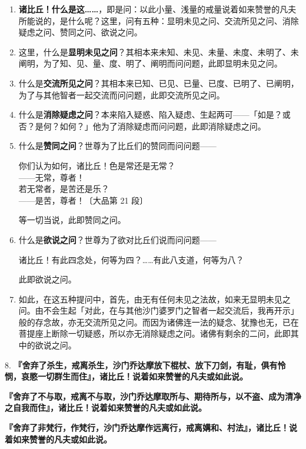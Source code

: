 \begin{enumerate}
\item \textbf{诸比丘！什么是这……}，即是问：以此小量、浅量的戒量说着如来赞誉的凡夫所能说的，是什么呢？这里，问有五种：显明未见之问、交流所见之问、消除疑虑之问、赞同之问、欲说之问。
\item 这里，什么是\textbf{显明未见之问}？其相本来未知、未见、未量、未度、未明了、未阐明，为了知、见、量、度、明了、阐明而问问题，此即显明未见之问。
\item 什么是\textbf{交流所见之问}？其相本来已知、已见、已量、已度、已明了、已阐明，为了与其他智者一起交流而问问题，此即交流所见之问。
\item 什么是\textbf{消除疑虑之问}？本来陷入疑惑、陷入疑虑、生起两可——「如是？或否？是何？如何？」他为了消除疑虑而问问题，此即消除疑虑之问。
\item 什么是\textbf{赞同之问}？世尊为了比丘们的赞同而问问题——\begin{quoting}你们认为如何，诸比丘！色是常还是无常？\\——无常，尊者！\\若无常者，是苦还是乐？\\——是苦，尊者！{\bluefootnotesize 〔大品第 21 段〕}\end{quoting}等一切当说，此即赞同之问。
\item 什么是\textbf{欲说之问}？世尊为了欲对比丘们说而问问题——\begin{quoting}诸比丘！有此四念处，何等为四？……有此八支道，何等为八？\end{quoting}此即欲说之问。
\item 如此，在这五种提问中，首先，由无有任何未见之法故，如来无显明未见之问。由不会生起「对此，在与其他沙门婆罗门之智者一起交流后，我再开示」般的存念故，亦无交流所见之问。而因为诸佛连一法的疑念、犹豫也无，已在菩提座上断除一切疑惑，所以亦无消除疑虑之问。诸佛有剩余的二问，此即其中的欲说之问。\end{enumerate}

{\Large 8.} \textbf{『舍弃了杀生，戒离杀生，沙门乔达摩放下棍杖、放下刀剑，有耻，俱有怜悯，哀愍一切群生而住』，诸比丘！说着如来赞誉的凡夫或如此说。}

\textbf{『舍弃了不与取，戒离不与取，沙门乔达摩取所与、期待所与，以不盗、成为清净之自我而住』，诸比丘！说着如来赞誉的凡夫或如此说。}

\textbf{『舍弃了非梵行，作梵行，沙门乔达摩作远离行，戒离媾和、村法』，诸比丘！说着如来赞誉的凡夫或如此说。}

